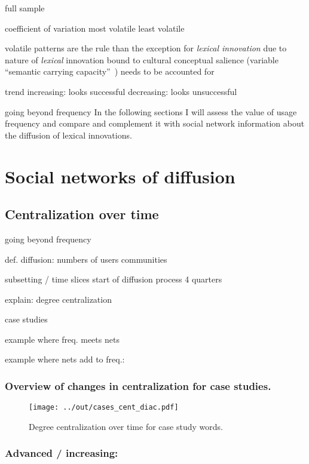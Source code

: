 \documentclass[draft, a4paper, abstract=on]{scrartcl}
\begin{document}
  full sample

  coefficient of variation
  most volatile
  least volatile

  volatile patterns are the rule than the exception for \emph{lexical innovation}
  due to nature of \emph{lexical} innovation
  bound to cultural conceptual salience (variable \enquote{semantic carrying capacity}~\parencite{Nini2017ApplicationGrowth})
  needs to be accounted for

  trend
  increasing: looks successful
  decreasing: looks unsuccessful

  going beyond frequency
  In the following sections I will assess the value of usage frequency and compare and complement it with social network information about the diffusion of lexical innovations.

\section{Social networks of diffusion}

  \subsection{Centralization over time}

  going beyond frequency

  def. diffusion:
  numbers of users
  communities

  subsetting / time slices
  start of diffusion process
  4 quarters

  explain: degree centralization

  case studies

  example where freq. meets nets

  example where nets add to freq.: 

    \subsubsection{Overview of changes in centralization for case studies.}

  \begin{figure}[H]
  \caption{Degree centralization over time for case study words.}
  \centering
  \texttt{[image: ../out/cases\_cent\_diac.pdf]}
  \end{figure}

    \subsubsection{Advanced / increasing: }
\end{document}
